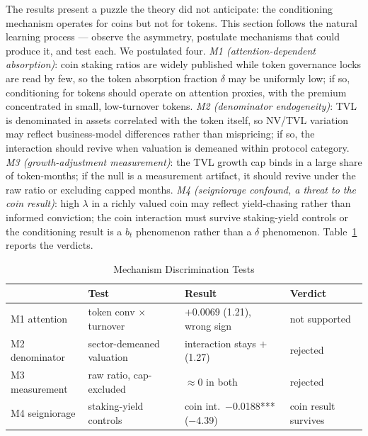 \documentclass[12pt]{article}
\begin{document}
The results present a puzzle the theory did not anticipate: the conditioning
mechanism operates for coins but not for tokens. This section follows the natural
learning process --- observe the asymmetry, postulate mechanisms that could produce it,
and test each. We postulated four. \textit{M1 (attention-dependent absorption)}: coin
staking ratios are widely published while token governance locks are read by few, so
the token absorption fraction $\delta$ may be uniformly low; if so, conditioning for
tokens should operate on attention proxies, with the premium concentrated in small,
low-turnover tokens. \textit{M2 (denominator endogeneity)}: TVL is denominated in
assets correlated with the token itself, so NV/TVL variation may reflect business-model
differences rather than mispricing; if so, the interaction should revive when valuation
is demeaned within protocol category. \textit{M3 (growth-adjustment measurement)}: the
TVL growth cap binds in a large share of token-months; if the null is a measurement
artifact, it should revive under the raw ratio or excluding capped months.
\textit{M4 (seigniorage confound, a threat to the coin result)}: high $\lambda$ in a
richly valued coin may reflect yield-chasing rather than informed conviction; the coin
interaction must survive staking-yield controls or the conditioning result is a $b_t$
phenomenon rather than a $\delta$ phenomenon. Table~\ref{tab:mechanisms} reports the
verdicts.

\begin{table}[ht]
\centering
\caption{Mechanism Discrimination Tests}
\label{tab:mechanisms}
\small
\begin{tabular}{llll}
\toprule
 & Test & Result & Verdict \\
\midrule
M1 attention & token conv $\times$ turnover & $+$0.0069 (1.21), wrong sign & not supported \\
M2 denominator & sector-demeaned valuation & interaction stays $+$ (1.27) & rejected \\
M3 measurement & raw ratio, cap-excluded & $\approx 0$ in both & rejected \\
M4 seigniorage & staking-yield controls & coin int.\ $-$0.0188*** ($-$4.39) & coin result survives \\
\bottomrule
\end{tabular}
\end{table}
\end{document}
